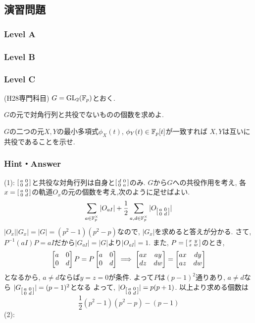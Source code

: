 \subsection{演習問題}

\subsubsection{Level A}

\subsubsection{Level B}

\subsubsection{Level C}

\begin{prob} (H28専門科目) \label{prob:H28senmon-3}
$G = \mathrm{GL}_{2}(\mathbb{F}_{p})$とおく.
\ben
\item $G$の元で対角行列と共役でないものの個数を求めよ.
\item $G$の二つの元$X,Y$の最小多項式$\phi_X(t)$, $\phi_Y(t)\in \mathbb{F}_{p}[t]$が一致すれば $X,Y$は互いに共役であることを示せ.
\item
\een
\end{prob}



\subsubsection{Hint・Answer}
\begin{probans}
(1): $\left[\begin{smallmatrix}a&0\\0 &d\end{smallmatrix}\right]$と共役な対角行列は自身と$\left[\begin{smallmatrix}d&0\\ 0&a\end{smallmatrix}\right]$のみ. $G$から$G$への共役作用を考え, 各$x=\left[\begin{smallmatrix}a&0\\ 0&d\end{smallmatrix}\right]$の軌道$O_{x}$の元の個数を考え,次のように足せばよい.
\[\sum_{a\in \mathbb{F}_{p}^{\times}} |O_{aI}| + \dfrac{1}{2}\sum_{a,d \in \mathbb{F}_{p}^{\times} } |O_{\left[\begin{smallmatrix}a&0 \\ 0 & d\end{smallmatrix}\right]}|  \]
$|O_x||G_x| = |G| = (p^2-1)(p^2-p)$なので, $|G_x|$を求めると答えが分かる. さて, $P^{-1}(aI)P = aI$だから$|G_{aI}| = |G|$より$|O_{aI}| = 1$. また, $P=\left[\begin{smallmatrix}x&y\\ z&w\end{smallmatrix}\right]$のとき,
\[\begin{bmatrix}a& 0\\ 0&d\end{bmatrix}P = P\begin{bmatrix}a&0 \\ 0 &d\end{bmatrix}\implies \begin{bmatrix}ax & ay \\ dz & dw\end{bmatrix} = \begin{bmatrix}ax & dy \\ az & dw\end{bmatrix}\]
となるから, $a\neq d$ならば$y=z=0$が条件. よって$P$は$(p-1)^2$通りあり, $a\neq d$なら $|G_{\left[\begin{smallmatrix}a&0\\0&d\end{smallmatrix}\right]}| = (p-1)^2$となる よって, $|O_{\left[\begin{smallmatrix}a&0\\ 0&d\end{smallmatrix}\right]}| = p(p+1)$. 以上より求める個数は
\[\dfrac{1}{2}(p^2- 1)(p^2-p) - (p-1)\]
(2):


\end{probans}








\clearpage
